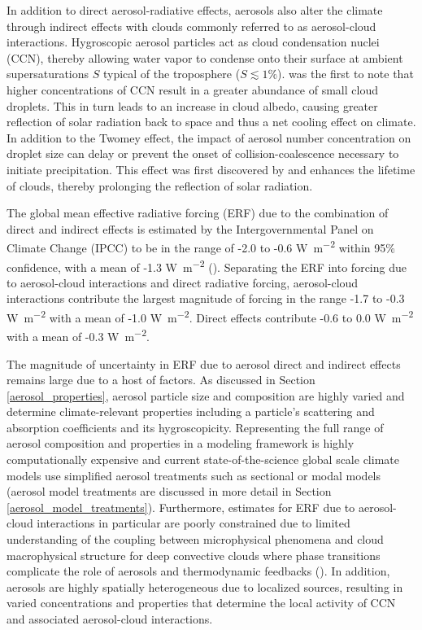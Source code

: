 In addition to direct aerosol-radiative effects, aerosols also alter the climate through indirect effects with clouds commonly referred to as aerosol-cloud interactions. Hygroscopic aerosol particles act as cloud condensation nuclei (CCN), thereby allowing water vapor to condense onto their surface at ambient supersaturations $S$ typical of the troposphere ($S\lesssim1\%$). \textcite{twomey_influence_1977} was the first to note that higher concentrations of CCN result in a greater abundance of small cloud droplets. This in turn leads to an increase in cloud albedo, causing greater reflection of solar radiation back to space and thus a net cooling effect on climate. In addition to the Twomey effect, the impact of aerosol number concentration on droplet size can delay or prevent the onset of collision-coalescence necessary to initiate precipitation. This effect was first discovered by \cite{albrecht_aerosols_1989} and enhances the lifetime of clouds, thereby prolonging the reflection of solar radiation. 


The global mean effective radiative forcing (ERF) due to the combination of direct and indirect effects is estimated by the Intergovernmental Panel on Climate Change (IPCC) to be in the range of -2.0 to -0.6 \si{W.m^{-2}} within 95\% confidence, with a mean of -1.3 \si{W.m^{-2}} (\cite{ipcc_report_2021}). Separating the ERF into forcing due to aerosol-cloud interactions and direct radiative forcing, aerosol-cloud interactions contribute the largest magnitude of forcing in the range -1.7 to -0.3 \si{W.m^{-2}} with a mean of -1.0 \si{W.m^{-2}}. Direct effects contribute -0.6 to 0.0 \si{W.m^{-2}} with a mean of -0.3 \si{W.m^{-2}}. 

The magnitude of uncertainty in ERF due to aerosol direct and indirect effects remains large due to a host of factors. As discussed in Section \ref{aerosol_properties}, aerosol particle size and composition are highly varied and determine climate-relevant properties including a particle's scattering and absorption coefficients and its hygroscopicity. Representing the full range of aerosol composition and properties in a modeling framework is highly computationally expensive and current state-of-the-science global scale climate models use simplified aerosol treatments such as sectional or modal models (aerosol model treatments are discussed in more detail in Section \ref{aerosol_model_treatments}). Furthermore, estimates for ERF due to aerosol-cloud interactions in particular are poorly constrained due to limited understanding of the coupling between microphysical phenomena and cloud macrophysical structure for deep convective clouds where phase transitions complicate the role of aerosols and thermodynamic feedbacks (\cite{fan_review_2016}). In addition, aerosols are highly spatially heterogeneous due to localized sources, resulting in varied concentrations and properties that determine the local activity of CCN and associated aerosol-cloud interactions.

